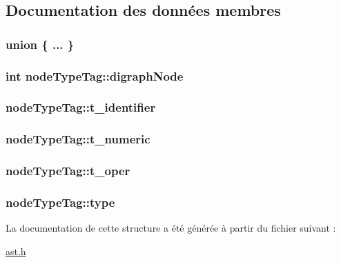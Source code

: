 \subsection{Documentation des données membres}
\hypertarget{structnodeTypeTag_a3e466bd4079e3ecfd8bba2dc323948ed}{\subsubsection[{"@1}]{\setlength{\rightskip}{0pt plus 5cm}union \{ ... \} }}\label{structnodeTypeTag_a3e466bd4079e3ecfd8bba2dc323948ed}
\hypertarget{structnodeTypeTag_a226ed9185fe6246ba0c51d8ce407bf99}{
\subsubsection[{digraph\-Node}]{\setlength{\rightskip}{0pt plus 5cm}int node\-Type\-Tag\-::digraph\-Node}}\label{structnodeTypeTag_a226ed9185fe6246ba0c51d8ce407bf99}
\hypertarget{structnodeTypeTag_a52029047facd5ca79d1555a4ee9d3351}{
\subsubsection[{t\-\_\-identifier}]{ node\-Type\-Tag\-::t\-\_\-identifier}}\label{structnodeTypeTag_a52029047facd5ca79d1555a4ee9d3351}
\hypertarget{structnodeTypeTag_aafce74687cbfc929557a304ce2a80127}{
\subsubsection[{t\-\_\-numeric}]{ node\-Type\-Tag\-::t\-\_\-numeric}}\label{structnodeTypeTag_aafce74687cbfc929557a304ce2a80127}
\hypertarget{structnodeTypeTag_a932c223fde8957f1f7fecbeb438f0915}{
\subsubsection[{t\-\_\-oper}]{ node\-Type\-Tag\-::t\-\_\-oper}}\label{structnodeTypeTag_a932c223fde8957f1f7fecbeb438f0915}
\hypertarget{structnodeTypeTag_acd45ff2a9579322364fc31e50502a23c}{
\subsubsection[{type}]{ node\-Type\-Tag\-::type}}\label{structnodeTypeTag_acd45ff2a9579322364fc31e50502a23c}


La documentation de cette structure a été générée à partir du fichier suivant \-:\begin{DoxyCompactItemize}
\item 
\hyperlink{ast_8h}{ast.\-h}\end{DoxyCompactItemize}

